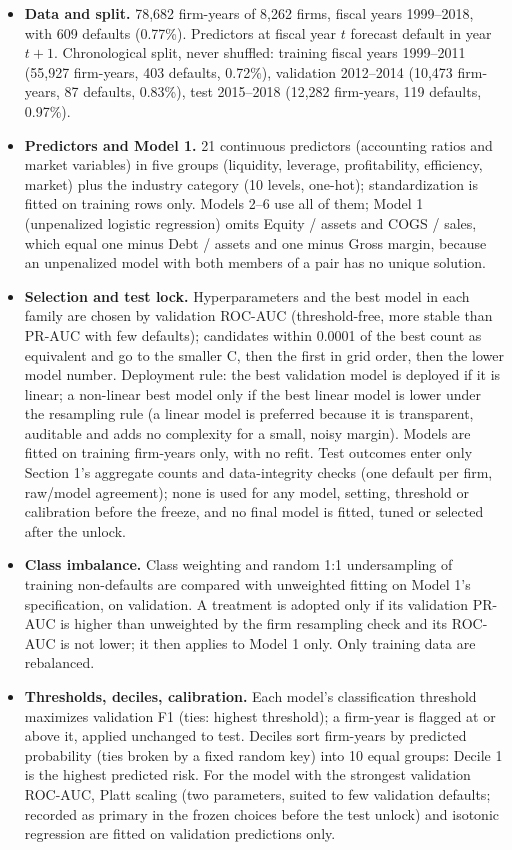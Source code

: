 \documentclass[9pt,letterpaper]{extarticle}
\begin{document}
{\small
\begin{itemize}
  \item \textbf{Data and split.} 78,682 firm-years of 8,262 firms, fiscal years 1999--2018, with 609 defaults (0.77\%). Predictors at fiscal year $t$ forecast default in year $t+1$. Chronological split, never shuffled: training fiscal years 1999--2011 (55,927 firm-years, 403 defaults, 0.72\%), validation 2012--2014 (10,473 firm-years, 87 defaults, 0.83\%), test 2015--2018 (12,282 firm-years, 119 defaults, 0.97\%).
  \item \textbf{Predictors and Model 1.} 21 continuous predictors (accounting ratios and market variables) in five groups (liquidity, leverage, profitability, efficiency, market) plus the industry category (10 levels, one-hot); standardization is fitted on training rows only. Models 2--6 use all of them; Model 1 (unpenalized logistic regression) omits Equity / assets and COGS / sales, which equal one minus Debt / assets and one minus Gross margin, because an unpenalized model with both members of a pair has no unique solution.
  \item \textbf{Selection and test lock.} Hyperparameters and the best model in each family are chosen by validation ROC-AUC (threshold-free, more stable than PR-AUC with few defaults); candidates within 0.0001 of the best count as equivalent and go to the smaller C, then the first in grid order, then the lower model number. Deployment rule: the best validation model is deployed if it is linear; a non-linear best model only if the best linear model is lower under the resampling rule (a linear model is preferred because it is transparent, auditable and adds no complexity for a small, noisy margin). Models are fitted on training firm-years only, with no refit. Test outcomes enter only Section 1's aggregate counts and data-integrity checks (one default per firm, raw/model agreement); none is used for any model, setting, threshold or calibration before the freeze, and no final model is fitted, tuned or selected after the unlock.
  \item \textbf{Class imbalance.} Class weighting and random 1:1 undersampling of training non-defaults are compared with unweighted fitting on Model 1's specification, on validation. A treatment is adopted only if its validation PR-AUC is higher than unweighted by the firm resampling check and its ROC-AUC is not lower; it then applies to Model 1 only. Only training data are rebalanced.
  \item \textbf{Thresholds, deciles, calibration.} Each model's classification threshold maximizes validation F1 (ties: highest threshold); a firm-year is flagged at or above it, applied unchanged to test. Deciles sort firm-years by predicted probability (ties broken by a fixed random key) into 10 equal groups: Decile 1 is the highest predicted risk. For the model with the strongest validation ROC-AUC, Platt scaling (two parameters, suited to few validation defaults; recorded as primary in the frozen choices before the test unlock) and isotonic regression are fitted on validation predictions only.

\end{itemize}}
\end{document}

